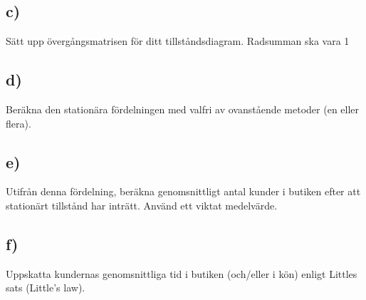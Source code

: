 \documentclass[a4paper]{article}
\begin{document}
\subsection{c)}
Sätt upp övergångsmatrisen för ditt tillståndsdiagram. Radsumman ska vara 1

\subsection{d)}
Beräkna den stationära fördelningen med valfri av ovanstående metoder (en eller
flera).

\subsection{e)}
Utifrån denna fördelning, beräkna genomsnittligt antal kunder i butiken efter att
stationärt tillstånd har inträtt. Använd ett viktat medelvärde.

\subsection{f)}
Uppskatta kundernas genomsnittliga tid i butiken (och/eller i kön) enligt Littles sats
(Little's law).






\newpage
\printbibliography{}
\end{document}
